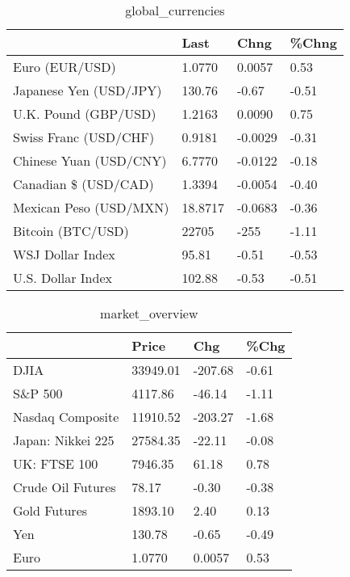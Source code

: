 \documentclass{article}%
\begin{document}
%


\begin{table}[htbp]%
\caption{global\_currencies}%
\centering%
\begin{adjustbox}{width=1\textwidth}%
\begin{tabular}{llll}
\toprule
                       &    Last &    Chng & \%Chng \\
\midrule
        Euro (EUR/USD) &  1.0770 &  0.0057 &  0.53 \\
Japanese Yen (USD/JPY) &  130.76 &   -0.67 & -0.51 \\
  U.K. Pound (GBP/USD) &  1.2163 &  0.0090 &  0.75 \\
 Swiss Franc (USD/CHF) &  0.9181 & -0.0029 & -0.31 \\
Chinese Yuan (USD/CNY) &  6.7770 & -0.0122 & -0.18 \\
  Canadian \$ (USD/CAD) &  1.3394 & -0.0054 & -0.40 \\
Mexican Peso (USD/MXN) & 18.8717 & -0.0683 & -0.36 \\
     Bitcoin (BTC/USD) &   22705 &    -255 & -1.11 \\
      WSJ Dollar Index &   95.81 &   -0.51 & -0.53 \\
     U.S. Dollar Index &  102.88 &   -0.53 & -0.51 \\
\bottomrule
\end{tabular}
%
\end{adjustbox}%
\end{table}

%


\begin{table}[htbp]%
\caption{market\_overview}%
\centering%
\begin{adjustbox}{width=1\textwidth}%
\begin{tabular}{llll}
\toprule
                  &    Price &     Chg &  \%Chg \\
\midrule
             DJIA & 33949.01 & -207.68 & -0.61 \\
          S\&P 500 &  4117.86 &  -46.14 & -1.11 \\
 Nasdaq Composite & 11910.52 & -203.27 & -1.68 \\
Japan: Nikkei 225 & 27584.35 &  -22.11 & -0.08 \\
     UK: FTSE 100 &  7946.35 &   61.18 &  0.78 \\
Crude Oil Futures &    78.17 &   -0.30 & -0.38 \\
     Gold Futures &  1893.10 &    2.40 &  0.13 \\
              Yen &   130.78 &   -0.65 & -0.49 \\
             Euro &   1.0770 &  0.0057 &  0.53 \\
\bottomrule
\end{tabular}
%
\end{adjustbox}%
\end{table}

%
\end{document}
